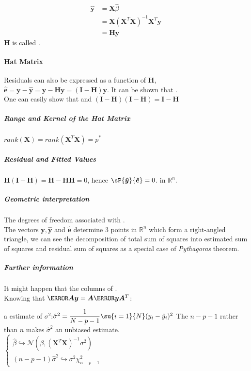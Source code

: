 \begin{align*}
\hat{\bm{y}} &=\bm{X}\hat{\beta}\\
	     &=\bm{X}\left(\bm{X}^{T}\bm{X}\right)^{-1}\bm{X}^{T}\bm{y}\\
	     &=\bm{H}\bm{y}
\end{align*}
$\bm{H}$ is called .
\paragraph{Hat Matrix}
Residuals can also be expressed as a function of $\bm{H}$,
$\bm{\hat{e}} = \bm{y} - \bm{\hat{y}} = \bm{y} - \bm{Hy} = (\bm{I}-\bm{H})\bm{y}$.
It can be shown that .\\
One can easily show that  and $\left(\bm{I-H}\right)\left(\bm{I-H}\right)
= \bm{I-H}$

\subparagraph{Range and Kernel of the Hat Matrix}
$rank(\bm{X}) = rank(\bm{X}^{T}\bm{X}) = p^{*}$
\subparagraph{Residual and Fitted Values}
$\bm{H}(\bm{I}-\bm{H}) = \bm{H} -\bm{HH} = 0$, hence $\sP{\bm{\hat{y}}}{\bm{\hat{e}}} = 0$.
 in $\mathbb{R}^{n}$.
\subparagraph{Geometric interpretation}
The degrees of freedom associated with .\\
The vectors $\bm{y}, \bm{\hat{y}}$ and $\bm{\hat{e}}$ determine 3 points in $\mathbb{R}^{n}$ which
form a right-angled triangle, we can see the decomposition of total sum of squares into estimated
sum of squares and residual sum of squares as a special case of \emph{Pythagoras} theorem.
\subparagraph{Further information}
It might happen that the columns of .\\ 
Knowing that $\V{\bm{A}\bm{y}}=\bm{A}\V{\bm{y}}\bm{A}^{T}$:
\begin{center}
\end{center}
a estimate of $\sigma^{2}$:$\hat{\sigma}^{2} = \dfrac{1}{N-p-1}\su{{i=1}}{N}(y_{i}-\hat{y}_{i})^{2}$ 
The $n-p-1$ rather than $n$ makes $\hat{\sigma}^{2}$ an unbiased
estimate.\\
$
\begin{cases}
\hat{\beta}\hookrightarrow\mathcal{N}\left(\beta, (\bm{X}^{T}\bm{X})^{-1}\sigma^{2}\right)\\
(n-p-1)\hat{\sigma}^{2}\hookrightarrow\sigma^{2}\chi_{n-p-1}^{2}
\end{cases}
$

